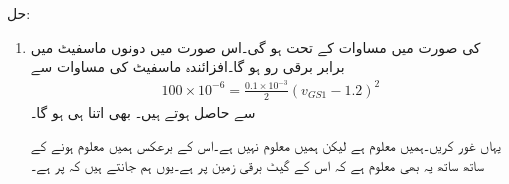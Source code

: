 حل:
\begin{enumerate}
\item
{} کی صورت میں مساوات  کے تحت  ہو گی۔اس صورت میں دونوں ماسفیٹ میں برابر برقی رو ہو گا۔افزائندہ ماسفیٹ کی مساوات سے
\begin{align*}
100 \times 10^{-6}=\frac{0.1 \times 10^{-3}}{2}\left(v_{GS1}-1.2 \right)^2
\end{align*}
سے  حاصل ہوتے ہیں۔ بھی اتنا ہی ہو گا۔

یہاں غور کریں۔ہمیں  معلوم ہے لیکن ہمیں  معلوم نہیں ہے۔اس کے برعکس ہمیں  معلوم ہونے کے ساتھ ساتھ یہ بھی معلوم ہے کہ اس  کے گیٹ برقی زمین پر ہے۔یوں ہم جانتے ہیں کہ  پر ہے۔


\end{enumerate}
